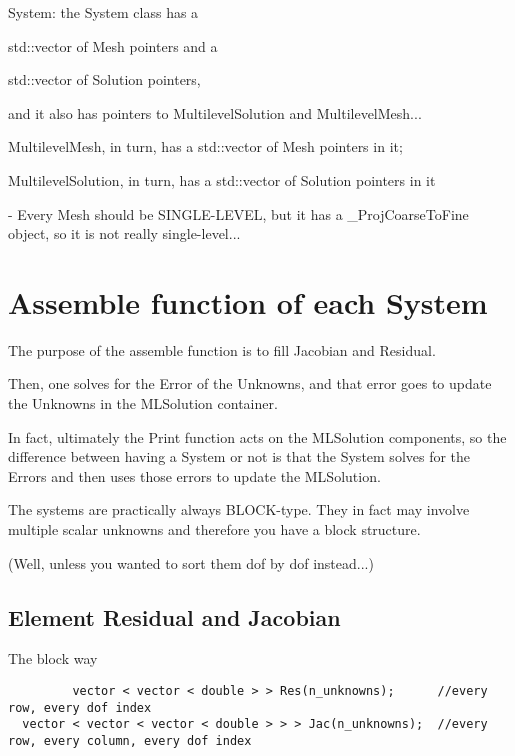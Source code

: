 \documentclass[10pt]{book}
\begin{document}
   
   System: the System class has a 
   
   std::vector of Mesh pointers and a 
   
   std::vector of Solution pointers,
   
   and it also has pointers to MultilevelSolution and MultilevelMesh...
   
   MultilevelMesh, in turn, has a std::vector of Mesh pointers in it;
   
   MultilevelSolution, in turn, has a std::vector of Solution pointers in it
   
   
   - Every Mesh should be SINGLE-LEVEL, but it has a \_ProjCoarseToFine object, so it is not really single-level...
      

      
   \section{Assemble function of each System}
   
    The purpose of the assemble function is to fill Jacobian and Residual.
    
    Then, one solves for the Error of the Unknowns, and that error
    goes to update the Unknowns in the MLSolution container.
    
     In fact, ultimately the Print function acts on the MLSolution components,
     so the difference between having a System or not 
     is that the System solves for the Errors and then uses those errors to update the MLSolution.
   
   
     The systems are practically always BLOCK-type. 
     They in fact may involve multiple scalar unknowns and therefore you have a block structure.
     
     (Well, unless you wanted to sort them dof by dof instead...)
     
     
    \subsection{Element Residual and Jacobian}
     
     The block way
     
      \begin{verbatim}
         vector < vector < double > > Res(n_unknowns);      //every row, every dof index
  vector < vector < vector < double > > > Jac(n_unknowns);  //every row, every column, every dof index

      \end{verbatim}
\end{document}
